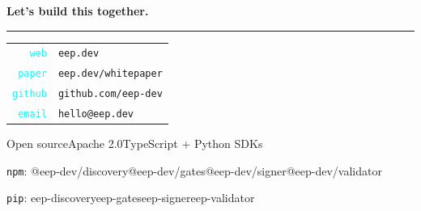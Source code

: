 \documentclass[aspectratio=169,10pt]{beamer}
\begin{document}
{
\begin{frame}[plain]
\vspace{1.45cm}
\begin{center}
  {\fontsize{26}{32}\selectfont\color{txtw}\textbf{Let's build this together.}\par}
  \vspace{0.85cm}
  {\color{slate}\rule{4cm}{0.3pt}}\par
  \vspace{0.8cm}
  {\small\color{txtm}%
  \begin{tabular}{rl}
    \textcolor{cyan}{\texttt{web}} & \texttt{eep.dev} \\[6pt]
    \textcolor{cyan}{\texttt{paper}} & \texttt{eep.dev/whitepaper} \\[6pt]
    \textcolor{cyan}{\texttt{github}} & \texttt{github.com/eep-dev} \\[6pt]
    \textcolor{cyan}{\texttt{email}} & \texttt{hello@eep.dev} \\
  \end{tabular}
  }\par
  \vspace{0.6cm}
  {\footnotesize\color{slate}%
    Open source\quad\textperiodcentered\quad Apache 2.0\quad\textperiodcentered\quad TypeScript + Python SDKs}\par
  \vspace{0.15cm}
  {\scriptsize\color{slate}%
    \texttt{npm}:\; @eep-dev/discovery\quad @eep-dev/gates\quad @eep-dev/signer\quad @eep-dev/validator\par
    \vspace{2pt}
    \texttt{pip}:\; eep-discovery\quad eep-gates\quad eep-signer\quad eep-validator}
\end{center}
\end{frame}
}
\end{document}
